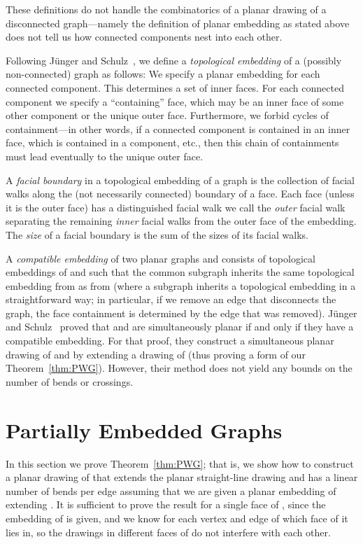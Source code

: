 \documentclass{llncs}
\begin{document}
These definitions do not handle the combinatorics of a planar drawing of a disconnected graph---namely the definition of planar embedding as stated above does not tell us how connected components nest into each other.



Following  J{\"u}nger and Schulz~\cite{JS}, we
define a \emph{topological embedding} of a (possibly non-connected) graph as follows: We specify a planar embedding for each connected component.  This determines a set of inner faces. For each connected component we specify a ``containing'' face, which may be an inner face of some other component or the unique outer face.   Furthermore, we forbid cycles of containment---in other words, if a connected component is contained in an inner face, which is contained in a component, etc., then this chain of containments must lead eventually to the unique outer face.

A {\em facial boundary} in a topological embedding of a graph is the collection of facial walks along the (not necessarily connected) boundary of a face. Each face (unless it is the outer face) has a distinguished facial walk we call the {\em outer} facial walk separating the remaining {\em inner} facial walks from the outer face of the embedding. The {\em size} of a facial boundary is the sum of the sizes of its facial walks.

A \emph{compatible embedding} of two planar graphs  and  consists of topological embeddings of  and  such that the common subgraph  inherits the same topological embedding from  as from  (where a subgraph inherits a topological embedding in a straightforward way; in particular, if we remove an edge that disconnects the graph, the face containment is determined by the edge that was removed). J{\"u}nger and Schulz~\cite{JS} proved that  and  are simultaneously planar if and only if they have a compatible embedding. For that proof, they construct a simultaneous planar drawing of  and  by extending a drawing of  (thus proving a form of our Theorem~\ref{thm:PWG}). However, their method does not yield any bounds on the number of bends or crossings.


\section{Partially Embedded Graphs}\label{sec:PEG}

In this section we prove Theorem~\ref{thm:PWG}; that is, we show how to construct a planar drawing of  that extends the planar straight-line drawing  and has a linear number of bends per edge assuming that we are given a planar embedding of  extending . It is sufficient to prove the result for a single face  of , since the embedding of  is given, and we know for each vertex and edge of  which face of  it lies in, so the drawings in different faces of  do not interfere with each other.
\end{document}

